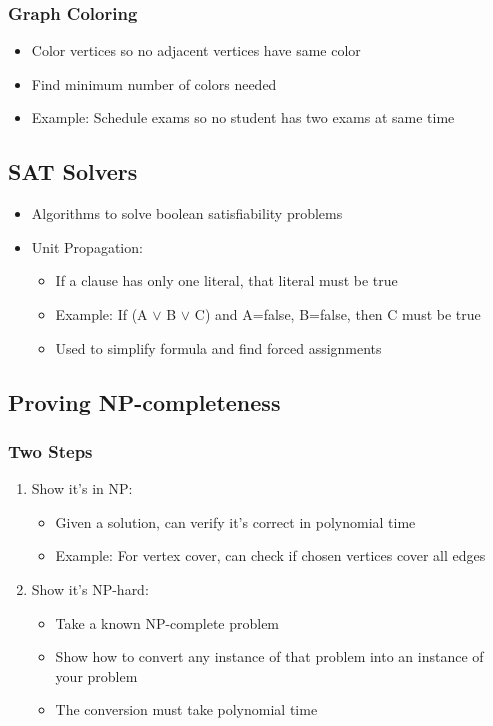 \documentclass[11pt,a4paper]{article}
\begin{document}
\begin{multicols}{2}
\subsubsection{Graph Coloring}
\begin{itemize}
    \item Color vertices so no adjacent vertices have same color
    \item Find minimum number of colors needed
    \item Example: Schedule exams so no student has two exams at same time
\end{itemize}

\subsection{SAT Solvers}
\begin{itemize}
    \item Algorithms to solve boolean satisfiability problems
    \item Unit Propagation:
    \begin{itemize}
        \item If a clause has only one literal, that literal must be true
        \item Example: If (A $\lor$ B $\lor$ C) and A=false, B=false, then C must be true
        \item Used to simplify formula and find forced assignments
    \end{itemize}
\end{itemize}

\subsection{Proving NP-completeness}
\subsubsection{Two Steps}
\begin{enumerate}
    \item Show it's in NP:
    \begin{itemize}
        \item Given a solution, can verify it's correct in polynomial time
        \item Example: For vertex cover, can check if chosen vertices cover all edges
    \end{itemize}
    \item Show it's NP-hard:
    \begin{itemize}
        \item Take a known NP-complete problem
        \item Show how to convert any instance of that problem into an instance of your problem
        \item The conversion must take polynomial time
    \end{itemize}
\end{enumerate}


\end{multicols}
\end{document}
